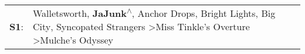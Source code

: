 \begin{supertabular}{p{0.03\textwidth}p{0.92\textwidth}}
 \textbf{S1}:  &  Walletsworth\textsuperscript{}, \enspace \textbf{JaJunk\textsuperscript{$\wedge$}}, \enspace Anchor Drops\textsuperscript{}, \enspace Bright Lights, Big City\textsuperscript{}, \enspace Syncopated Strangers\textsuperscript{} \textgreater \enspace Miss Tinkle's Overture\textsuperscript{} \textgreater \enspace Mulche's Odyssey\textsuperscript{}  \enspace  \\
\end{supertabular}
